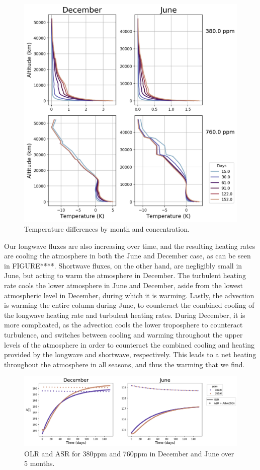 \documentclass[12]{article}
\begin{document}
\begin{figure}[htb!]
\noindent\includegraphics[width=.8\textwidth]{figures/temp_evolution.png}
\centering
\caption{Temperature differences by month and  concentration.}
\label{fig:temp_step}
\end{figure}
Our longwave fluxes are also increasing over time, and the resulting heating rates are cooling the atmosphere in both the June and December case, as can be seen in FIGURE****. Shortwave fluxes, on the other hand, are negligibly small in June, but acting to warm the atmosphere in December. The turbulent heating rate cools the lower atmosphere in June and December, aside from the lowest atmospheric level in December, during which it is warming. Lastly, the advection is warming the entire column during June, to counteract the combined cooling of the longwave heating rate and turbulent heating rates. During December, it is more complicated, as the advection cools the lower troposphere to counteract turbulence, and switches between cooling and warming throughout the upper levels of the atmosphere in order to counteract the combined cooling and heating provided by the longwave and shortwave, respectively. This leads to a net heating throughout the atmosphere in all seasons, and thus the warming that we find.

\begin{figure}[htb!]
\noindent\includegraphics[width=1\textwidth]{figures/ASR_OLR.png}
\centering
\caption{OLR and ASR for 380ppm and 760ppm in December and June over 5 months.}
\label{fig:ASR_OLR}
\end{figure}
\end{document}
